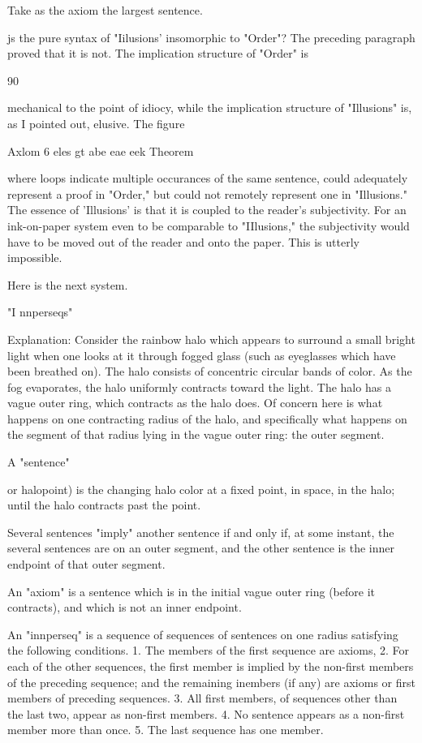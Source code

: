 \documentclass[10pt,twoside]{memoir}
\begin{document}
\begin{enumerate}
{{{{{{{{{{{{{{{{Take as the axiom the largest sentence. 


js the pure syntax of "Iilusions' insomorphic to "Order"? The preceding 
paragraph proved that it is not. The implication structure of "Order" is 


90 


mechanical to the point of idiocy, while the implication structure of 
"Illusions" is, as I pointed out, elusive. The figure 


Axlom 6 eles gt abe eae eek Theorem 


where loops indicate multiple occurances of the same sentence, could 
adequately represent a proof in "Order," but could not remotely represent 
one in "Illusions." The essence of 'Illusions' is that it is coupled to the 
reader's subjectivity. For an ink-on-paper system even to be comparable to 
"IIlusions," the subjectivity would have to be moved out of the reader and 
onto the paper. This is utterly impossible. 

Here is the next system. 


"I nnperseqs" 


Explanation: Consider the rainbow halo which appears to surround a small 
bright light when one looks at it through fogged glass (such as 
eyeglasses which have been breathed on). The halo consists of 
concentric circular bands of color. As the fog evaporates, the halo 
uniformly contracts toward the light. The halo has a vague outer 
ring, which contracts as the halo does. Of concern here is what 
happens on one contracting radius of the halo, and specifically 
what happens on the segment of that radius lying in the vague 
outer ring: the outer segment. 

A "sentence" {or halopoint) is the changing halo color at a fixed point, in 
space, in the halo; until the halo contracts past the point. 

Several sentences "imply" another sentence if and only if, at some instant, 
the several sentences are on an outer segment, and the other 
sentence is the inner endpoint of that outer segment. 

An "axiom" is a sentence which is in the initial vague outer ring (before it 
contracts), and which is not an inner endpoint. 

An "innperseq" is a sequence of sequences of sentences on one radius 
satisfying the following conditions. 1. The members of the first 
sequence are axioms, 2. For each of the other sequences, the first 
member is implied by the non-first members of the preceding 
sequence; and the remaining inembers (if any) are axioms or first 
members of preceding sequences. 3. All first members, of 
sequences other than the last two, appear as non-first members. 4. 
No sentence appears as a non-first member more than once. 5. The 
last sequence has one member. 

}}}}}}}}}}}}}}}}}
\end{enumerate}
\end{document}
